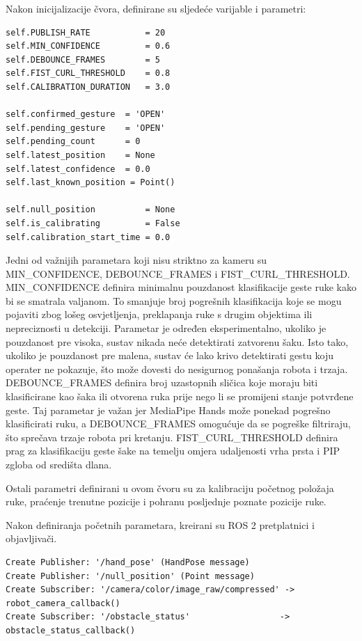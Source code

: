 \documentclass[12pt,a4paper,oneside]{report}
\begin{document}
Nakon inicijalizacije čvora, definirane su sljedeće varijable i parametri:

\begin{verbatim}
self.PUBLISH_RATE           = 20
self.MIN_CONFIDENCE         = 0.6
self.DEBOUNCE_FRAMES        = 5
self.FIST_CURL_THRESHOLD    = 0.8
self.CALIBRATION_DURATION   = 3.0

self.confirmed_gesture  = 'OPEN'
self.pending_gesture    = 'OPEN'
self.pending_count      = 0
self.latest_position    = None
self.latest_confidence  = 0.0
self.last_known_position = Point()

self.null_position          = None
self.is_calibrating         = False
self.calibration_start_time = 0.0
\end{verbatim}

Jedni od važnijih parametara koji nisu striktno za kameru 
su MIN\_CONFIDENCE, DEBOUNCE\_FRAMES i FIST\_CURL\_THRESHOLD. MIN\_CONFIDENCE definira 
minimalnu pouzdanost klasifikacije geste ruke kako bi se smatrala valjanom. To smanjuje broj pogrešnih 
klasifikacija koje se mogu pojaviti zbog lošeg osvjetljenja, preklapanja ruke s drugim objektima ili 
nepreciznosti u detekciji. Parametar je određen eksperimentalno, ukoliko je pouzdanost pre visoka, sustav 
nikada neće detektirati zatvorenu šaku. Isto tako, ukoliko je pouzdanost pre malena, sustav će lako krivo 
detektirati gestu koju operater ne pokazuje, što može dovesti do nesigurnog ponašanja robota i trzaja. 
DEBOUNCE\_FRAMES definira broj uzastopnih 
sličica koje moraju biti klasificirane kao šaka ili otvorena ruka prije nego li se promijeni stanje potvrđene 
geste. Taj parametar je važan jer MediaPipe Hands može ponekad pogrešno klasificirati ruku, a DEBOUNCE\_FRAMES 
omogućuje da se pogreške filtriraju, što sprečava trzaje robota pri kretanju. FIST\_CURL\_THRESHOLD definira 
prag za klasifikaciju geste šake na temelju omjera udaljenosti vrha prsta i PIP zgloba od središta dlana. 

Ostali parametri definirani u ovom čvoru su za kalibraciju početnog položaja ruke, praćenje trenutne pozicije 
i pohranu posljednje poznate pozicije ruke.

Nakon definiranja početnih parametara, kreirani su ROS 2 pretplatnici i objavljivači.

\begin{verbatim}
Create Publisher: '/hand_pose' (HandPose message)
Create Publisher: '/null_position' (Point message)
Create Subscriber: '/camera/color/image_raw/compressed' -> robot_camera_callback()
Create Subscriber: '/obstacle_status'                  -> obstacle_status_callback()
\end{verbatim}
\end{document}
